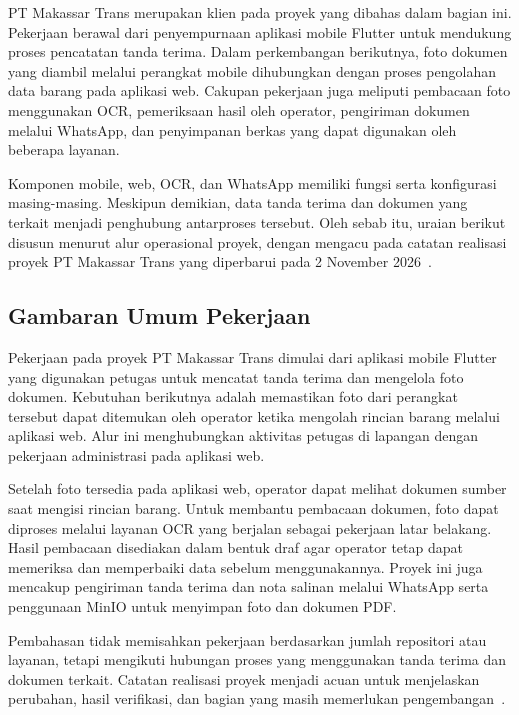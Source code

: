 PT Makassar Trans merupakan klien pada proyek yang dibahas dalam bagian ini. Pekerjaan berawal dari penyempurnaan aplikasi mobile Flutter untuk mendukung proses pencatatan tanda terima. Dalam perkembangan berikutnya, foto dokumen yang diambil melalui perangkat mobile dihubungkan dengan proses pengolahan data barang pada aplikasi web. Cakupan pekerjaan juga meliputi pembacaan foto menggunakan OCR, pemeriksaan hasil oleh operator, pengiriman dokumen melalui WhatsApp, dan penyimpanan berkas yang dapat digunakan oleh beberapa layanan.

Komponen mobile, web, OCR, dan WhatsApp memiliki fungsi serta konfigurasi masing-masing. Meskipun demikian, data tanda terima dan dokumen yang terkait menjadi penghubung antarproses tersebut. Oleh sebab itu, uraian berikut disusun menurut alur operasional proyek, dengan mengacu pada catatan realisasi proyek PT Makassar Trans yang diperbarui pada 2 November 2026~\cite{matrans_realisasi}.

\subsection{Gambaran Umum Pekerjaan}

Pekerjaan pada proyek PT Makassar Trans dimulai dari aplikasi mobile Flutter yang digunakan petugas untuk mencatat tanda terima dan mengelola foto dokumen. Kebutuhan berikutnya adalah memastikan foto dari perangkat tersebut dapat ditemukan oleh operator ketika mengolah rincian barang melalui aplikasi web. Alur ini menghubungkan aktivitas petugas di lapangan dengan pekerjaan administrasi pada aplikasi web.

Setelah foto tersedia pada aplikasi web, operator dapat melihat dokumen sumber saat mengisi rincian barang. Untuk membantu pembacaan dokumen, foto dapat diproses melalui layanan OCR yang berjalan sebagai pekerjaan latar belakang. Hasil pembacaan disediakan dalam bentuk draf agar operator tetap dapat memeriksa dan memperbaiki data sebelum menggunakannya. Proyek ini juga mencakup pengiriman tanda terima dan nota salinan melalui WhatsApp serta penggunaan MinIO untuk menyimpan foto dan dokumen PDF.

Pembahasan tidak memisahkan pekerjaan berdasarkan jumlah repositori atau layanan, tetapi mengikuti hubungan proses yang menggunakan tanda terima dan dokumen terkait. Catatan realisasi proyek menjadi acuan untuk menjelaskan perubahan, hasil verifikasi, dan bagian yang masih memerlukan pengembangan~\cite{matrans_realisasi}.

